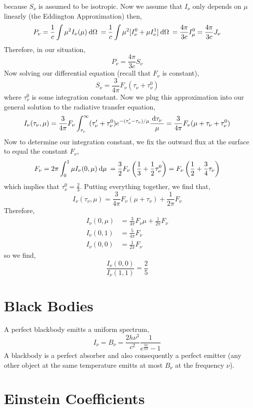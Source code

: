 \documentclass[11pt, a4paper]{article}
\begin{document}
because $S_\nu$ is assumed to be isotropic. Now we assume that $I_\nu$ only depends on $\mu$ linearly (the Eddington Approximation) then,
\[ P_\nu = \frac{1}{c} \int \mu^2 I_\nu(\mu) \: \mathrm{d}\Omega \: = \frac{1}{c} \int \mu^2 [I^0_\nu + \mu I^1_\nu ] \: \mathrm{d}\Omega \: = \frac{4 \pi}{3 c} I^0_\mu = \frac{4 \pi}{3 c} J_\nu \] 
Therefore, in our situation,
\[ P_\nu = \frac{4 \pi}{3c} S_\nu \]
Now solving our differential equation (recall that $F_\nu$ is constant),
\[ S_\nu  = \frac{3}{4 \pi} F_\nu (\tau_\nu + \tau_\nu^0) \]
where $\tau_\nu^0$ is some integration constant. Now we plug this approximation into our general solution to the radiative transfer equation,
\[ I_\nu(\tau_\nu, \mu) = \frac{3}{4 \pi} F_\nu \int^{\infty}_{\tau_\nu} (\tau_\nu' + \tau_\nu^0) e^{-(\tau_\nu' - \tau_\nu) / \mu} \frac{\: \mathrm{d}\tau_\nu \:}{\mu} = \frac{3}{4 \pi} F_\nu (\mu + \tau_\nu + \tau_\nu^0) \]
Now to determine our integration constant, we fix the outward flux at the surface to equal the constant $F_\nu$,
\[ F_\nu = 2 \pi \int_0^1 \mu I_\nu(0, \mu) \: \mathrm{d}\mu \: = \frac{3}{2} F_\nu \left( \frac{1}{3} + \frac{1}{2} \tau_\nu^0 \right) = F_\nu \left( \frac{1}{2}  + \frac{3}{4} \tau_\nu \right) \]
which implies that $\tau_\nu^0 = \frac{2}{3}$. Putting everything together, we find that,
\[ I_\nu(\tau_\nu, \mu) = \frac{3}{4 \pi} F_\nu \left( \mu + \tau_\nu \right) + \frac{1}{2 \pi} F_\nu \]
Therefore,
\begin{align*}
I_\nu(0, \mu) & = \frac{3}{4 \pi} F_\nu \mu + \frac{1}{2 \pi} F_\nu
\\
I_\nu(0, 1) & = \frac{5}{4\pi} F_\nu
\\
I_\nu(0, 0) & = \frac{1}{2 \pi} F_\nu
\end{align*}
so we find,
\[ \frac{I_\nu(0, 0)}{I_\nu(1,1)} = \frac{2}{5} \]

\section{Black Bodies}

A perfect blackbody emitts a uniform spectrum,
\[ I_\nu = B_\nu = \frac{2 h \nu^3}{c^2} \frac{1}{e^{\frac{h\nu}{h T}} - 1} \]
A blackbody is a perfect absorber and also consequently a perfect emitter (any other object at the same temperature emitts at most $B_\nu$ at the frequency $\nu$). 



\section{Einstein Coefficients}
\end{document}
